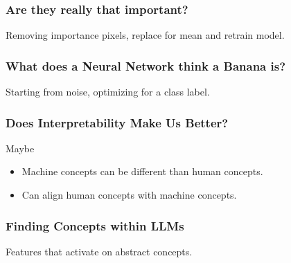\subsubsection{Are they really that important?}
\begin{example} Removing importance pixels, replace for mean and retrain model.
\end{example}

\subsubsection{What does a Neural Network think a Banana is?}
\begin{example}
    Starting from noise, optimizing for a class label.
\end{example}
\newpage

\subsubsection{Does Interpretability Make Us Better?}
\begin{example}
    Maybe
    \begin{itemize}
        \item Machine concepts can be different than human concepts. 
        \item Can align human concepts with machine concepts.
    \end{itemize}
\end{example}

\subsubsection{Finding Concepts within LLMs}
\begin{example} Features that activate on abstract concepts. 
\end{example}

